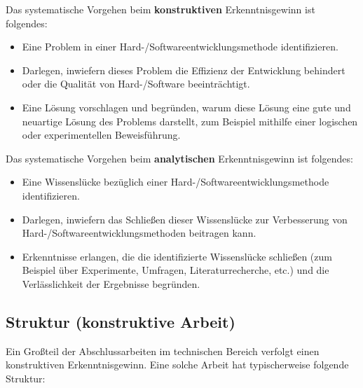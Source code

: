 Das systematische Vorgehen beim \textbf{konstruktiven} Erkenntnisgewinn ist folgendes:
\begin{itemize}
    \item Eine Problem in einer Hard-/Softwareentwicklungsmethode identifizieren.
    \item Darlegen, inwiefern dieses Problem die Effizienz der Entwicklung behindert oder die Qualität von Hard-/Software beeinträchtigt.
    \item Eine Lösung vorschlagen und begründen, warum diese Lösung eine gute und neuartige Lösung des Problems darstellt, zum Beispiel mithilfe einer logischen oder experimentellen Beweisführung.
\end{itemize}

Das systematische Vorgehen beim \textbf{analytischen} Erkenntnisgewinn ist folgendes:
\begin{itemize}
    \item Eine Wissenslücke bezüglich einer Hard-/Softwareentwicklungsmethode identifizieren.
    \item Darlegen, inwiefern das Schließen dieser Wissenslücke zur Verbesserung von Hard-/Softwareentwicklungsmethoden beitragen kann.
    \item Erkenntnisse erlangen, die die identifizierte Wissenslücke schließen (zum Beispiel über Experimente, Umfragen, Literaturrecherche, etc.) und die Verlässlichkeit der Ergebnisse begründen.
\end{itemize}



\subsection{Struktur (konstruktive Arbeit)}

Ein Großteil der Abschlussarbeiten im technischen Bereich verfolgt einen konstruktiven Erkenntnisgewinn. Eine solche Arbeit hat typischerweise folgende Struktur:


